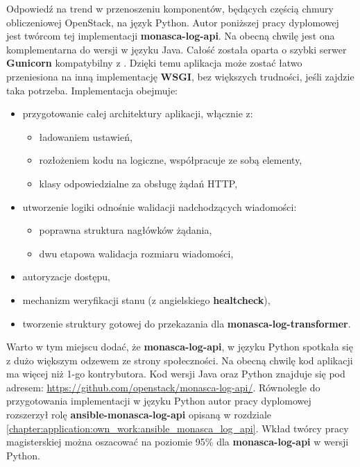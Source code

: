 Odpowiedź na trend w przenoszeniu komponentów, będących częścią chmury obliczeniowej OpenStack, na język Python. Autor poniższej pracy dyplomowej jest twórcom tej implementacji \textbf{monasca-log-api}. Na obecną chwilę jest ona komplementarna do wersji w języku Java. Całość została oparta o szybki serwer \textbf{Gunicorn} kompatybilny z . Dzięki
temu aplikacja może zostać łatwo przeniesiona na inną implementację \textbf{WSGI}, bez większych trudności,
jeśli zajdzie taka potrzeba. Implementacja obejmuje:
\begin{itemize}
    \item przygotowanie całej architektury aplikacji, włącznie z:
    \begin{itemize}
        \item ładowaniem ustawień,
        \item rozłożeniem kodu na logiczne, współpracuje ze sobą elementy,
        \item klasy odpowiedzialne za obsługę żądań HTTP,
    \end{itemize}
    \item utworzenie logiki odnośnie walidacji nadchodzących wiadomości:
    \begin{itemize}
        \item poprawna struktura nagłówków żądania,
        \item dwu etapowa walidacja rozmiaru wiadomości,
    \end{itemize}
    \item autoryzacje dostępu,
    \item mechanizm weryfikacji stanu (z angielskiego \textbf{healtcheck}),
    \item tworzenie struktury gotowej do przekazania dla \textbf{monasca-log-transformer}.
\end{itemize}

Warto w tym miejscu dodać, że \textbf{monasca-log-api}, w języku Python spotkała się z dużo
większym odzewem ze strony społeczności. Na obecną chwilę kod aplikacji ma więcej niż 1-go kontrybutora.
Kod wersji Java oraz Python znajduje się pod adresem: \url{https://github.com/openstack/monasca-log-api/}.
Równolegle do przygotowania implementacji w języku Python autor pracy dyplomowej rozszerzył rolę
\textbf{ansible-monasca-log-api} opisaną w rozdziale \ref{chapter:application:own_work:ansible_monasca_log_api}.
Wkład twórcy pracy magisterskiej można oszacować na poziomie 95\% dla \textbf{monasca-log-api} w wersji
Python.

